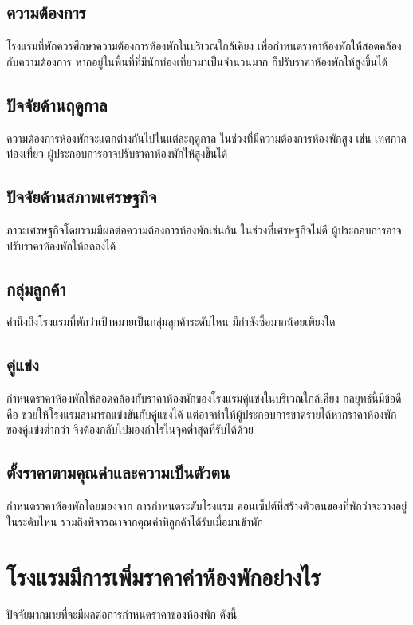 \documentclass{report}
\begin{document}
\subsection{ความต้องการ}
โรงแรมที่พักควรศึกษาความต้องการห้องพักในบริเวณใกล้เคียง เพื่อกำหนดราคาห้องพักให้สอดคล้องกับความต้องการ หากอยู่ในพื้นที่ที่มีนักท่องเที่ยวมาเป็นจำนวนมาก ก็ปรับราคาห้องพักให้สูงขึ้นได้
\subsection{ปัจจัยด้านฤดูกาล}
ความต้องการห้องพักจะแตกต่างกันไปในแต่ละฤดูกาล ในช่วงที่มีความต้องการห้องพักสูง เช่น เทศกาลท่องเที่ยว ผู้ประกอบการอาจปรับราคาห้องพักให้สูงขึ้นได้
\subsection{ปัจจัยด้านสภาพเศรษฐกิจ}
ภาวะเศรษฐกิจโดยรวมมีผลต่อความต้องการห้องพักเช่นกัน ในช่วงที่เศรษฐกิจไม่ดี ผู้ประกอบการอาจปรับราคาห้องพักให้ลดลงได้
\subsection{กลุ่มลูกค้า}
คำนึงถึงโรงแรมที่พักว่าเป้าหมายเป็นกลุ่มลูกค้าระดับไหน มีกำลังซื้อมากน้อยเพียงใด 
\subsection{คู่แข่ง}
กำหนดราคาห้องพักให้สอดคล้องกับราคาห้องพักของโรงแรมคู่แข่งในบริเวณใกล้เคียง กลยุทธ์นี้มีข้อดีคือ ช่วยให้โรงแรมสามารถแข่งขันกับคู่แข่งได้ แต่อาจทำให้ผู้ประกอบการขาดรายได้หากราคาห้องพักของคู่แข่งต่ำกว่า จึงต้องกลับไปมองกำไรในจุดต่ำสุดที่รับได้ด้วย
\subsection{ตั้งราคาตามคุณค่าและความเป็นตัวตน}
กำหนดราคาห้องพักโดยมองจาก  การกำหนดระดับโรงแรม คอนเซ็ปต์ที่สร้างตัวตนของที่พักว่าจะวางอยู่ในระดับไหน รวมถึงพิจารณาจากคุณค่าที่ลูกค้าได้รับเมื่อมาเข้าพัก\cite{price}

\section{โรงแรมมีการเพิ่มราคาค่าห้องพักอย่างไร}
ปัจจัยมากมายที่จะมีผลต่อการกำหนดราคาของห้องพัก ดังนี้
\end{document}
